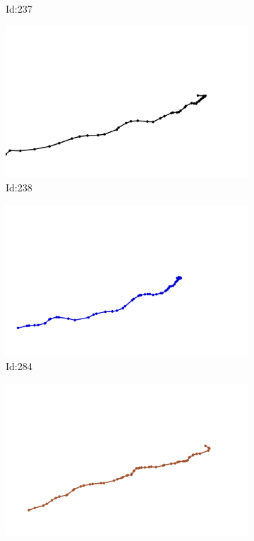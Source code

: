 \documentclass[12pt,twoside]{report}
\begin{document}
\begin{figure}
\begin{subfigure}[b]{0.20\textwidth}
\caption{Id:237}
\end{subfigure}
\begin{subfigure}[b]{0.20\textwidth}
\centering
\includegraphics[width=\textwidth]{../trajectories/238.png}
\caption{Id:238}
\end{subfigure}
\begin{subfigure}[b]{0.20\textwidth}
\centering
\includegraphics[width=\textwidth]{../trajectories/284.png}
\caption{Id:284}
\end{subfigure}
\begin{subfigure}[b]{0.20\textwidth}
\centering
\includegraphics[width=\textwidth]{../trajectories/324.png}

\end{subfigure}
\end{figure}
\end{document}
